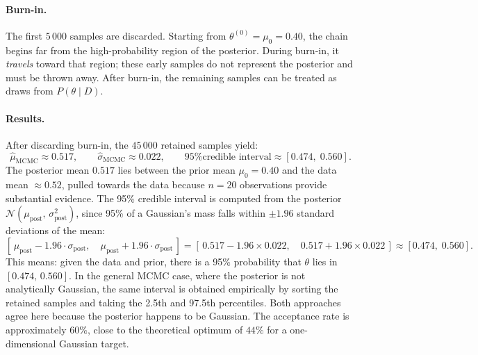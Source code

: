 \documentclass[12pt, a4paper]{article}
\begin{document}
\paragraph{Burn-in.}
The first $5\,000$ samples are discarded. Starting from
$\theta^{(0)} = \mu_0 = 0.40$, the chain begins far from the
high-probability region of the posterior. During burn-in, it
\emph{travels} toward that region; these early samples do not
represent the posterior and must be thrown away. After burn-in,
the remaining samples can be treated as draws from
$P(\theta \mid D)$.

\paragraph{Results.}
After discarding burn-in, the $45\,000$ retained samples yield:
\[
    \hat{\mu}_\text{MCMC} \approx 0.517, \qquad
    \hat{\sigma}_\text{MCMC} \approx 0.022, \qquad
    \text{95\% credible interval} \approx [0.474,\; 0.560].
\]
The posterior mean $0.517$ lies between the prior mean $\mu_0 = 0.40$
and the data mean $\approx 0.52$, pulled towards the data because
$n = 20$ observations provide substantial evidence.
The 95\% credible interval is computed from the posterior
$\mathcal{N}(\mu_\text{post},\, \sigma_\text{post}^2)$, since 95\% of
a Gaussian's mass falls within $\pm 1.96$ standard deviations of the mean:
\[
    [\,\mu_\text{post} - 1.96\cdot\sigma_\text{post},\quad
       \mu_\text{post} + 1.96\cdot\sigma_\text{post}\,]
    = [\,0.517 - 1.96\times 0.022,\quad 0.517 + 1.96\times 0.022\,]
    \approx [0.474,\; 0.560].
\]
This means: given the data and prior, there is a 95\% probability
that $\theta$ lies in $[0.474,\, 0.560]$. In the general MCMC case,
where the posterior is not analytically Gaussian, the same interval
is obtained empirically by sorting the retained samples and taking
the 2.5th and 97.5th percentiles. Both approaches agree here because
the posterior happens to be Gaussian.
The acceptance rate is approximately $60\%$, close to the theoretical
optimum of $44\%$ for a one-dimensional Gaussian target.
\end{document}
